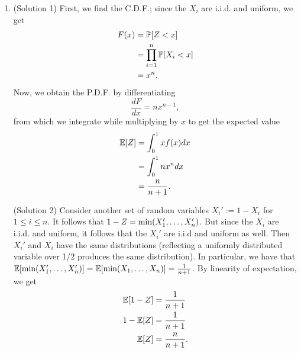 \begin{enumerate}
\begin{enumerate}
        \item (Solution 1) First, we find the C.D.F.; since the $X_i$ are i.i.d. and uniform, we get
        \begin{align*}
            F(x) &= \P[Z < x] \\
                &= \prod_{i = 1}^n \P[X_i < x] \\
                &= x^n.
        \end{align*}
        Now, we obtain the P.D.F. by differentiating
        \[
            \frac{dF}{dx} = nx^{n - 1},
        \]
        from which we integrate while multiplying by $x$ to get the expected value
        \begin{align*}
            \E[Z] &= \int_0^1 xf(x) dx \\
                &= \int_0^1 nx^n dx \\
                &= \frac{n}{n + 1}.
        \end{align*}
        
        (Solution 2) Consider another set of random variables $X_i':= 1 - X_i$ for $1 \leq i \leq n$. It follows that $1 - Z = \f{min}(X_1', \dots, X_n')$. But since the $X_i$ are i.i.d. and uniform, it follows that the $X_i'$ are i.i.d and uniform as well. Then $X_i'$ and $X_i$ have the same distributions (reflecting a uniformly distributed variable over 1/2 produces the same distribution). In particular, we have that $\E[\f{min}(X_1', \dots, X_n')] = \E[\f{min}(X_1, \dots, X_n)] = \frac{1}{n + 1}$. By linearity of expectation, we get
        \begin{align*}
            \E[1 - Z] &= \frac{1}{n + 1} \\
            1 - \E[Z] &= \frac{1}{n + 1} \\
            \E[Z] &= \frac{n}{n + 1}.
        \end{align*}
    \end{enumerate}
\end{enumerate}